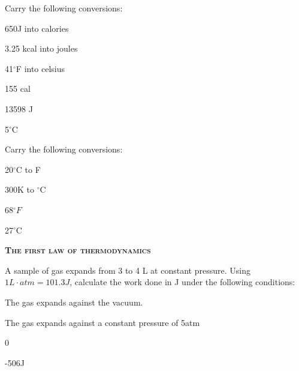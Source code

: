 \documentclass[main.tex]{subfiles}
\begin{document}
\begin{multicols*}{2}
\begin{question}[ID=\the\value{numA}]
Carry the following conversions:
\begin{inparaenum}[(a)]	
\item 650J into calories
\item	  3.25 kcal into joules
\item  41$^{\circ}$F into celsius
\end{inparaenum} 
\end{question}
\begin{solution}\begin{inparaenum}[(a)]
\item  155 cal
\item  13598 J
\item  5$^{\circ}$C
\end{inparaenum}\hspace{0.1cm}\end{solution}%
\begin{question}[ID=\the\value{numA}]
Carry the following conversions:
\begin{inparaenum}[(a)]	
\item 20$^{\circ}$C to F
\item	  300K to $^{\circ}$C
\end{inparaenum} 
\end{question}
\begin{solution}\begin{inparaenum}[(a)]
\item  68$^{\circ}F$
\item  27$^{\circ}$C
\end{inparaenum}\hspace{0.1cm}\end{solution}%



{\raggedright\textsc{\textbf{The first law of thermodynamics}}\par}

\begin{question}[ID=\the\value{numA}]
A sample of gas expands from 3 to 4 L at constant pressure. Using $1L\cdot atm=101.3J$, calculate the work done in J under the following conditions:
\begin{inparaenum}[(a)]	
\item The gas expands against the vacuum. 
\item The gas expands against a constant pressure of 5atm 
\end{inparaenum} 
\end{question}
\begin{solution}
\begin{inparaenum}[(a)]	
\item 0
\item	 -506J 
\end{inparaenum} 
 \hspace{0.1cm}\end{solution}


\end{multicols*}
\end{document}
